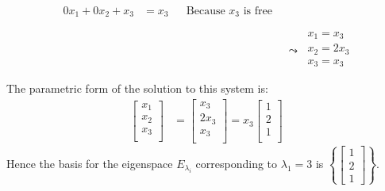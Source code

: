 \documentclass[10pt,letterpaper,final]{report}
\newcommand{\reason}[1]{&& \text{#1}}
\begin{document}
\begin{enumerate}[label=(\alph*)]
\begin{enumerate}
\begin{align*}
\begin{matrix}
                                                     0x_1 + 0x_2 + x_3 & = x_3 \reason{Because $x_3$ is free} \\
                                                   \end{matrix} \\[1ex]
                                             & \leadsto\ \begin{matrix}
                                                           x_1 = x_3  \\
                                                           x_2 = 2x_3 \\
                                                           x_3 = x_3  \\
                                                         \end{matrix}                                      \\[1ex]
                \end{align*}
                The parametric form of the solution to this system is:
                \begin{align*}
                  \begin{bmatrix}
                    x_1 \\
                    x_2 \\
                    x_3 \\
                  \end{bmatrix} & = \begin{bmatrix}
                                      x_3  \\
                                      2x_3 \\
                                      x_3  \\
                                    \end{bmatrix} = x_3\begin{bmatrix}
                                                         1 \\
                                                         2 \\
                                                         1 \\
                                                       \end{bmatrix}
                \end{align*}
                Hence the basis for the eigenspace $E_{\lambda_i}$ corresponding to $\lambda_1 = 3$ is $\left\{\begin{bmatrix}1\\2\\1\end{bmatrix}\right\}$.

\end{enumerate}
\end{enumerate}
\end{document}
